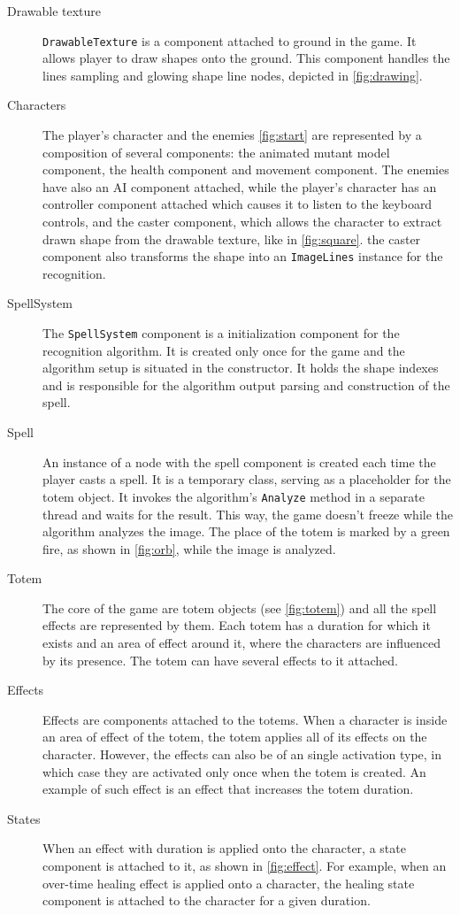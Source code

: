 \begin{description}
\item [Drawable texture] \texttt{DrawableTexture} is a component attached to ground in the game. It allows player to draw shapes onto the ground. This component handles the lines sampling and glowing shape line nodes, depicted in \cref{fig:drawing}.

\item [Characters] The player's character and the enemies \ref{fig:start} are represented by a composition of several components: the animated mutant model component, the health component and movement component. The enemies have also an AI component attached, while the player's character has an controller component attached which causes it to listen to the keyboard controls, and the caster component, which allows the character to extract drawn shape from the drawable texture, like in \cref{fig:square}. the caster component also transforms the shape into an \texttt{ImageLines} instance for the recognition.

\item [SpellSystem] The \texttt{SpellSystem} component is a initialization component for the recognition algorithm. It is created only once for the game and the algorithm setup is situated in the constructor. It holds the shape indexes and is responsible for the algorithm output parsing and construction of the spell.

\item [Spell] An instance of a node with the spell component is created each time the player casts a spell. It is a temporary class, serving as a placeholder for the totem object. It invokes the algorithm's \texttt{Analyze} method in a separate thread and waits for the result. This way, the game doesn't freeze while the algorithm analyzes the image. The place of the totem is marked by a green fire, as shown in \cref{fig:orb}, while the image is analyzed. 

\item [Totem] The core of the game are totem objects (see \cref{fig:totem}) and all the spell effects are represented by them. Each totem has a duration for which it exists and an area of effect around it, where the characters are influenced by its presence. The totem can have several effects to it attached. 

\item [Effects]  Effects are components attached to the totems. When a character is inside an area of effect of the totem, the totem applies all of its effects on the character. However, the effects can also be of an single activation type, in which case they are activated only once when the totem is created. An example of such effect is an effect that increases the totem duration.

\item [States] When an effect with duration is applied onto the character, a state component is attached to it, as shown in \cref{fig:effect}. For example, when an over-time healing effect is applied onto a character, the healing state component is attached to the character for a given duration.

\end{description}


